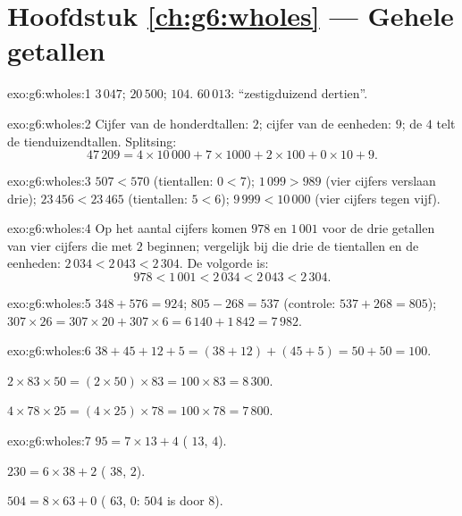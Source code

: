 \section*{Hoofdstuk \ref{ch:g6:wholes} --- Gehele getallen}

\begin{solution}{exo:g6:wholes:1}
$3\,047$; \quad $20\,500$; \quad $104$. \quad
$60\,013$: ``zestigduizend dertien''.
\end{solution}

\begin{solution}{exo:g6:wholes:2}
Cijfer van de honderdtallen: $2$; cijfer van de eenheden: $9$; de $4$ telt de
tienduizendtallen. Splitsing:
\[
47\,209 = 4 \times 10\,000 + 7 \times 1000 + 2 \times 100 + 0 \times 10
+ 9 .
\]
\end{solution}

\begin{solution}{exo:g6:wholes:3}
$507 < 570$ (tientallen: $0 < 7$); \quad
$1\,099 > 989$ (vier cijfers verslaan drie); \quad
$23\,456 < 23\,465$ (tientallen: $5 < 6$); \quad
$9\,999 < 10\,000$ (vier cijfers tegen vijf).
\end{solution}

\begin{solution}{exo:g6:wholes:4}
Op het aantal cijfers komen $978$ en $1\,001$ voor de drie getallen van vier
cijfers die met $2$ beginnen; vergelijk bij die drie de tientallen en de
eenheden: $2\,034 < 2\,043 < 2\,304$. De volgorde is:
\[
978 < 1\,001 < 2\,034 < 2\,043 < 2\,304 .
\]
\end{solution}

\begin{solution}{exo:g6:wholes:5}
$348 + 576 = 924$; \quad $805 - 268 = 537$ (controle:
$537 + 268 = 805$); \quad $307 \times 26 = 307 \times 20 + 307 \times 6
= 6\,140 + 1\,842 = 7\,982$.
\end{solution}

\begin{solution}{exo:g6:wholes:6}
$38 + 45 + 12 + 5 = (38 + 12) + (45 + 5) = 50 + 50 = 100$.

$2 \times 83 \times 50 = (2 \times 50) \times 83 = 100 \times 83 =
8\,300$.

$4 \times 78 \times 25 = (4 \times 25) \times 78 = 100 \times 78 =
7\,800$.
\end{solution}

\begin{solution}{exo:g6:wholes:7}
$95 = 7 \times 13 + 4$ ( $13$,  $4$).

$230 = 6 \times 38 + 2$ ( $38$,  $2$).

$504 = 8 \times 63 + 0$ ( $63$,  $0$: $504$ is  door
$8$).
\end{solution}

